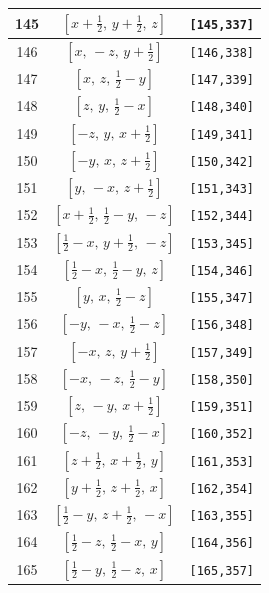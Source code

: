 \documentclass[fleqn,8pt]{jsarticle}
\begin{document}
\begin{longtable}{ccc}
145 & $\left[ x + \frac{1}{2},\, y + \frac{1}{2},\, z \right]$ & {\tt [145,337]} \\ \hline
146 & $\left[ x,\, - z,\, y + \frac{1}{2} \right]$ & {\tt [146,338]} \\ \hline
147 & $\left[ x,\, z,\, \frac{1}{2} - y \right]$ & {\tt [147,339]} \\ \hline
148 & $\left[ z,\, y,\, \frac{1}{2} - x \right]$ & {\tt [148,340]} \\ \hline
149 & $\left[ - z,\, y,\, x + \frac{1}{2} \right]$ & {\tt [149,341]} \\ \hline
150 & $\left[ - y,\, x,\, z + \frac{1}{2} \right]$ & {\tt [150,342]} \\ \hline
151 & $\left[ y,\, - x,\, z + \frac{1}{2} \right]$ & {\tt [151,343]} \\ \hline
152 & $\left[ x + \frac{1}{2},\, \frac{1}{2} - y,\, - z \right]$ & {\tt [152,344]} \\ \hline
153 & $\left[ \frac{1}{2} - x,\, y + \frac{1}{2},\, - z \right]$ & {\tt [153,345]} \\ \hline
154 & $\left[ \frac{1}{2} - x,\, \frac{1}{2} - y,\, z \right]$ & {\tt [154,346]} \\ \hline
155 & $\left[ y,\, x,\, \frac{1}{2} - z \right]$ & {\tt [155,347]} \\ \hline
156 & $\left[ - y,\, - x,\, \frac{1}{2} - z \right]$ & {\tt [156,348]} \\ \hline
157 & $\left[ - x,\, z,\, y + \frac{1}{2} \right]$ & {\tt [157,349]} \\ \hline
158 & $\left[ - x,\, - z,\, \frac{1}{2} - y \right]$ & {\tt [158,350]} \\ \hline
159 & $\left[ z,\, - y,\, x + \frac{1}{2} \right]$ & {\tt [159,351]} \\ \hline
160 & $\left[ - z,\, - y,\, \frac{1}{2} - x \right]$ & {\tt [160,352]} \\ \hline
161 & $\left[ z + \frac{1}{2},\, x + \frac{1}{2},\, y \right]$ & {\tt [161,353]} \\ \hline
162 & $\left[ y + \frac{1}{2},\, z + \frac{1}{2},\, x \right]$ & {\tt [162,354]} \\ \hline
163 & $\left[ \frac{1}{2} - y,\, z + \frac{1}{2},\, - x \right]$ & {\tt [163,355]} \\ \hline
164 & $\left[ \frac{1}{2} - z,\, \frac{1}{2} - x,\, y \right]$ & {\tt [164,356]} \\ \hline
165 & $\left[ \frac{1}{2} - y,\, \frac{1}{2} - z,\, x \right]$ & {\tt [165,357]} \\ \hline

\end{longtable}
\end{document}
